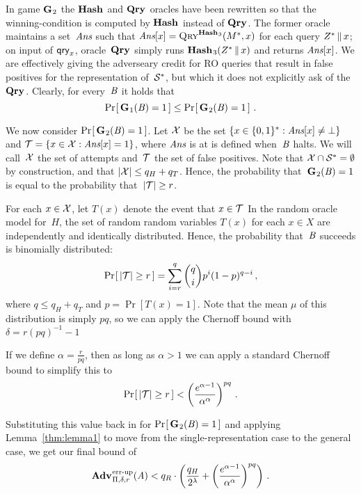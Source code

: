 In game $\textup{\textbf{G}}\hspace{0.5pt}_2$ the $\textup{\textbf{Hash}}\hspace{0.5pt}$ and $\textup{\textbf{Qry}}\hspace{0.5pt}$ oracles have been rewritten so that
the winning-condition is computed by $\textup{\textbf{Hash}}\hspace{0.5pt}$ instead of $\textup{\textbf{Qry}}\hspace{0.5pt}$. The former
oracle maintains a set~$\textit{Ans}$ such that $\textit{Ans}[x] = \textnormal{\textsc{Qry}}^{\textup{\textbf{Hash}}\hspace{0.5pt}_3}(M^*, x)$ for
each query $Z^* \, \| \, x$; on input of $\mathsf{qry}_x$, oracle~$\textup{\textbf{Qry}}\hspace{0.5pt}$ simply runs
$\textup{\textbf{Hash}}\hspace{0.5pt}_3(Z^* \, \| \, x)$ and returns $\textit{Ans}[x]$.
%
We are effectively giving the adverseary credit for RO queries that result in
false positives for the representation of~$\mathcal{S}^*$, but which it does not
explicitly ask of the~$\textup{\textbf{Qry}}\hspace{0.5pt}$. Clearly, for every~$\mathit{B}$ it holds that
%
\begin{equation}
  \Pr\hspace{-1pt}\left[\,\textup{\textbf{G}}\hspace{0.5pt}_1(\mathit{B})=1\,\right] \leq \Pr\hspace{-1pt}\left[\,\textup{\textbf{G}}\hspace{0.5pt}_2(\mathit{B})=1\,\right] \,.
\end{equation}

We now consider $\Pr\hspace{-1pt}\left[\,\textup{\textbf{G}}\hspace{0.5pt}_2(\mathit{B})=1\,\right]$.
%
Let $\mathcal{X}$ be the set $\{ x \in \{0,1\}^* : \textit{Ans}[x] \ne \bot \}$ and $\mathcal{T} = \{x
\in\mathcal{X}: \textit{Ans}[x] = 1\}$, where $\textit{Ans}$ is at is defined when~$\mathit{B}$ halts. We
will call~$\mathcal{X}$ the set of attempts and~$\mathcal{T}$ the set of false positives.
%
Note that $\mathcal{X}\cap\mathcal{S}^*=\emptyset$ by construction, and that
$|\mathcal{X}| \leq q_H + q_T$.
%
Hence, the probability that~$\textup{\textbf{G}}\hspace{0.5pt}_2(\mathit{B})=1$ is equal to the probability
that~$|\mathcal{T}| \geq r$.

For each $x\in\mathcal{X}$, let $T(x)$ denote the event that $x\in\mathcal{T}$
%
In the random oracle model for~$H$, the set of random random variables $T(x)$
for each $x\in X$ are independently and identically distributed.
%
Hence, the probability that~$\mathit{B}$ succeeds is binomially distributed:
%
\begin{equation}
  \Pr\hspace{-1pt}\left[\, |\mathcal{T}| \geq r \,\right] =
     \sum_{i=r}^{q} \binom{q}{i}p^i(1-p)^{q-i} \,,
\end{equation}
%
where $q \leq q_H + q_T$ and $p = \Pr[T(x)=1]$. Note that the mean $\mu$ of this
distribution is simply $pq$, so we can apply the Chernoff bound with
$\delta = r(pq)^{-1}-1$

If we define
$\alpha = \frac{r}{pq}$, then as long as $\alpha > 1$ we can apply a standard
Chernoff bound to simplify this to
\begin{equation}
  \Pr\hspace{-1pt}\left[\, |\mathcal{T}| \geq r \,\right] <
     \left(\frac{e^{\alpha-1}}{\alpha^\alpha}\right)^{pq} \,.
\end{equation}

Substituting this value back in for $\Pr\hspace{-1pt}\left[\,\textup{\textbf{G}}\hspace{0.5pt}_2(\mathit{B})=1\,\right]$ and applying
Lemma~\ref{thm:lemma1} to move from the single-representation case to the
general case, we get our final bound of
\begin{equation}
  \Adv{\errep}_{\Pi,\delta,r}(\advA) < q_R \cdot \left(\frac{q_H}{2^\lambda} + \left(\frac{e^{\alpha-1}}{\alpha^\alpha}\right)^{pq}\right) \,.
\end{equation}

%

